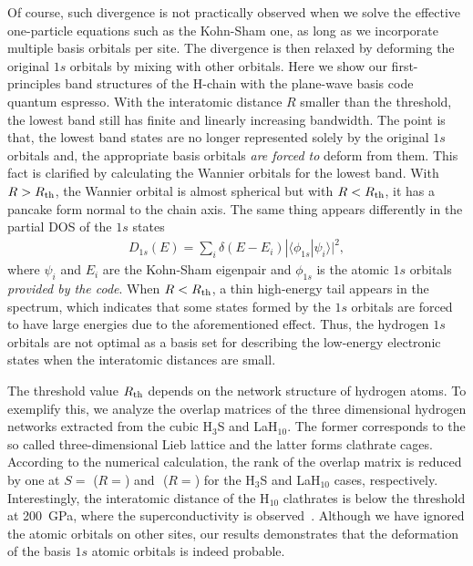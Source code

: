 \documentclass[twocolumn,showpacs,prb,amsfonts,amsmath,amssymb,floatfix,groupedaddress]{revtex4-1}
\begin{document}
Of course, such divergence is not practically observed when we solve the effective one-particle equations such as the Kohn-Sham one, as long as we incorporate multiple basis orbitals per site. The divergence is then relaxed by deforming the original $1s$ orbitals by mixing with other orbitals. Here we show our first-principles band structures of the H-chain with the plane-wave basis code {\sc quantum espresso}. With the interatomic distance $R$ smaller than the threshold, the lowest band still has finite and linearly increasing bandwidth. The point is that, the lowest band states are no longer represented solely by the original $1s$ orbitals and, the appropriate basis orbitals {\it are forced to} deform from them. This fact is clarified by calculating the Wannier orbitals for the lowest band. With $R>R_{\rm th}$, the Wannier orbital is almost spherical but with $R<R_{\rm th}$, it has a pancake form normal to the chain axis. The same thing appears differently in the partial DOS of the $1s$ states
\begin{eqnarray}
D_{1s}(E)
=
\sum_{i}\delta(E-E_{i})|\langle \phi_{1s}| \psi_{i}\rangle|^2
,
\end{eqnarray}
where $\psi_{i}$ and $E_{i}$ are the Kohn-Sham eigenpair and $\phi_{1s}$ is the atomic $1s$ orbitals {\it provided by the code}. When $R<R_{\rm th}$, a thin high-energy tail appears in the spectrum, which indicates that some states formed by the $1s$ orbitals are forced to have large energies due to the aforementioned effect. Thus, the hydrogen $1s$ orbitals are not optimal as a basis set for describing the low-energy electronic states when the interatomic distances are small.

The threshold value $R_{\rm th}$ depends on the network structure of hydrogen atoms. To exemplify this, we analyze the overlap matrices of the three dimensional hydrogen networks extracted from the cubic H$_{3}$S and LaH$_{10}$. The former corresponds to the so called three-dimensional Lieb lattice and the latter forms clathrate cages. According to the numerical calculation, the rank of the overlap matrix is reduced by one at $S=$ ($R=$) and $ $ ($R=$) for the H$_{3}$S and LaH$_{10}$ cases, respectively. Interestingly, the interatomic distance of the H$_{10}$ clathrates is below the threshold at 200~GPa, where the superconductivity is observed~\cite{}. Although we have ignored the atomic orbitals on other sites, our results demonstrates that the deformation of the basis $1s$ atomic orbitals is indeed probable.
\end{document}
